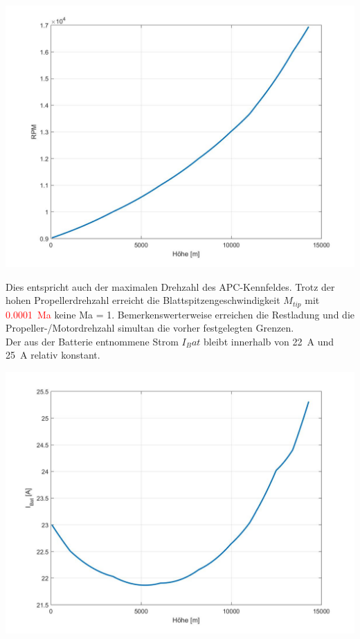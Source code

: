 \begin{center}
	\includegraphics[scale=0.3]{Diagramme/omega.jpg}
	\label{pic:omega_russland}
\end{center}
Dies entspricht auch der maximalen Drehzahl des APC-Kennfeldes. Trotz der hohen Propellerdrehzahl erreicht die Blattspitzengeschwindigkeit \ensuremath{M_{tip}} mit \textcolor{red}{\SI{0.0001}{Ma}} keine Ma = 1. Bemerkenswerterweise erreichen die Restladung und die Propeller-/Motordrehzahl simultan die vorher festgelegten Grenzen. \\
Der aus der Batterie entnommene Strom \ensuremath{I_Bat} bleibt innerhalb von \SI{22}{A} und \SI{25}{A} relativ konstant. 
\begin{center}
	\includegraphics[scale=0.3]{Diagramme/I_Bat.jpg}
	\label{pic:batteriestrom_russland}
\end{center}
